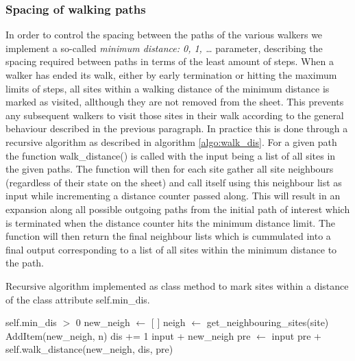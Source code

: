 \subsubsection{Spacing of walking paths} %
In order to control the spacing between the paths of the various walkers we
implement a so-called \textit{minimum distance: 0, 1, \ldots} parameter,
describing the spacing required between paths in terms of the least amount of
steps. When a walker has ended its walk, either by early termination or hitting
the maximum limits of steps, all sites within a walking distance of the minimum
distance is marked as visited, allthough they are not removed from the sheet.
This prevents any subsequent walkers to visit those sites in their walk
according to the general behaviour described in the
previous paragraph. In practice this is done through a recursive algorithm as described in algorithm \cref{algo:walk_dis}. For a given path the function walk\_distance() is called with the input being a list of all sites in the given paths. The function will then for each site gather all site neighbours (regardless of their state on the sheet) and call itself using this neighbour list as input while incrementing a distance counter passed along. This will result in an expansion along all possible outgoing paths from the initial path of interest which is terminated when the distance counter hits the minimum distance limit. The function will then return the final neighbour lists which is cummulated into a final output corresponding to a list of all sites within the minimum distance to the path.

\begin{algorithm}[H]
  \caption{Recursive algorithm implemented as class method to mark sites within a distance of the class attribute self.min\_dis.}
  \label{algo:walk_dis}
  \begin{algorithmic}[1]
    \Require self.min\_dis $>$ 0 
      \State new\_neigh $\gets$ [ ] 
        \State neigh $\gets$ get\_neighbouring\_sites(site) 
           
            \State AddItem(new\_neigh, n)
          \EndIf
        \EndFor
      \EndFor
      \State dis += 1 
       
        \State \Return input + new\_neigh 
      \Else {}
        \State pre $\gets$ input
        \State \Return pre +  self.walk\_distance(new\_neigh, dis, pre)
      \EndIf
    \EndFunction
  \end{algorithmic}
\end{algorithm}


